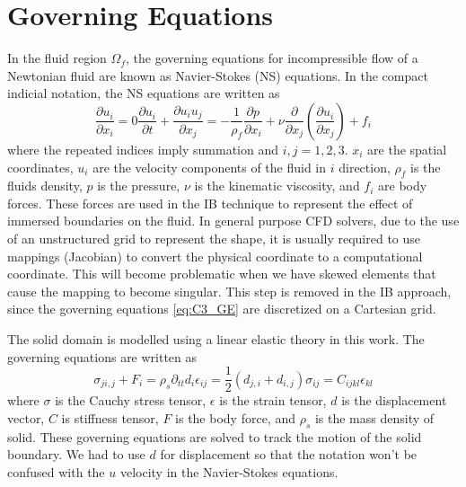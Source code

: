 \section{Governing Equations}
In the fluid region $\Omega_f$, the governing equations for incompressible flow of a Newtonian fluid are known as Navier-Stokes (NS) equations. In the compact indicial notation, the NS equations are written as
%
\begin{subequations}\label{eq:C3_GE}
\begin{equation}\label{eq:C3_continuity}
    \frac{\partial u_i}{\partial x_i} = 0
\end{equation}
\begin{equation}\label{eq:C3_momentum}
    \frac{\partial u_i}{\partial t} + \frac{\partial u_i u_j}{\partial x_j} = 
    -\frac{1}{\rho_f    } \frac{\partial p}{\partial x_i} + 
    \nu \frac{\partial}{\partial x_j} \left( \frac{\partial u_i}{\partial x_j} \right) + 
    f_i
\end{equation}
\end{subequations}
%
where the repeated indices imply summation and $i,j=1,2,3$. $x_i$ are the spatial coordinates, $u_i$ are the velocity components of the fluid in $i$ direction, $\rho_f$ is the fluids density, $p$ is the pressure, $\nu$ is the kinematic viscosity, and $f_i$ are body forces. These forces are used in the IB technique to represent the effect of immersed boundaries on the fluid. In general purpose CFD solvers, due to the use of an unstructured grid to represent the shape, it is usually required to use mappings (Jacobian) to convert the physical coordinate to a computational coordinate. This will become problematic when we have skewed elements that cause the mapping to become singular. This step is removed in the IB approach, since the governing equations \eqref{eq:C3_GE} are discretized on a Cartesian grid.

The solid domain is modelled using a linear elastic theory in this work. The governing equations are written as
%
\begin{subequations}\label{eq:C3_linearEalsticityEquations}
\begin{equation}
    \sigma_{ji,j} + F_i = \rho_s \partial_{tt} d_i
\end{equation}
\begin{equation}
    \epsilon_{ij} = \frac{1}{2} \left( d_{j,i} + d_{i,j} \right)
\end{equation}
\begin{equation}
    \sigma_{ij} = C_{ijkl} \epsilon_{kl}
\end{equation}
\end{subequations}
%
where $\sigma$ is the Cauchy stress tensor, $\epsilon$ is the strain tensor, $d$ is the displacement vector, $C$ is stiffness tensor, $F$ is the body force, and $\rho_s$ is the mass density of solid. These governing equations are solved to track the motion of the solid boundary. We had to use $d$ for displacement so that the notation won't be confused with the $u$ velocity in the Navier-Stokes equations.

